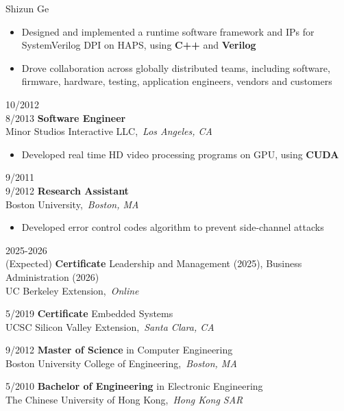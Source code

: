 \documentclass[10pt,letter]{article}
\def\sectionSpace{3pt}
\newcommand{\headerRight}[1]{
  \tcbsubtitle[halign upper=flush left]{\bf\LARGE\textsc{#1}}
}
\newcommand{\kw}[1]{{\bf{#1}}}
\newcommand{\job}[6]{
  \begin{rightColumnTwoBoxes}
    {#2}\\{#3}
  \tcblower
    {\bf {#1}}\\
    {{#4}},\ {\it {#5}}
    {#6}
  \end{rightColumnTwoBoxes}
}
\newcommand{\education}[5]{
  \begin{rightColumnTwoBoxes}
    {#3}
  \tcblower
    {\bf {#1}} {#2}\\
    {{#4}},\ {\it {#5}}
  \end{rightColumnTwoBoxes}
}
\begin{document}
\begin{resume}{Shizun Ge}
{\begin{itemize}
\begin{itemize}
          \item Delivered various \kw{Tcl scripts} to customers, accelerating debugging (weeks to hours), system bring-up, and runtime monitoring
        \end{itemize}
        \item Designed and implemented a runtime software framework and IPs for SystemVerilog DPI on HAPS, using \kw{C++} and \kw{Verilog}
        \item Drove collaboration across globally distributed teams, including software, firmware, hardware, testing, application engineers, vendors and customers
      \end{itemize}
    }
    \job{Software Engineer}{10/2012}{8/2013}{Minor Studios Interactive LLC}{Los Angeles, CA}{
      \begin{itemize}
        \item Developed real time HD video processing programs on GPU, using \kw{CUDA}
      \end{itemize}
    }
    \job{Research Assistant}{9/2011}{9/2012}{Boston University}{Boston, MA}{
      \begin{itemize}
        \item Developed error control codes algorithm to prevent side-channel attacks
      \end{itemize}
    }
    \vspace{-\sectionSpace}

  \headerRight{Education}
    \education{Certificate}{Leadership and Management (2025), Business Administration (2026)}{2025-2026\\(Expected)}
      {UC Berkeley Extension}{Online}
    \education{Certificate}{Embedded Systems}{5/2019}
      {UCSC Silicon Valley Extension}{Santa Clara, CA}
    \education{Master of Science}{in Computer Engineering}{9/2012}
      {Boston University College of Engineering}{Boston, MA}
    \education{Bachelor of Engineering}{in Electronic Engineering}{5/2010}
      {The Chinese University of Hong Kong}{Hong Kong SAR}
    \vspace{-\sectionSpace}

\end{resume}
\end{document}
